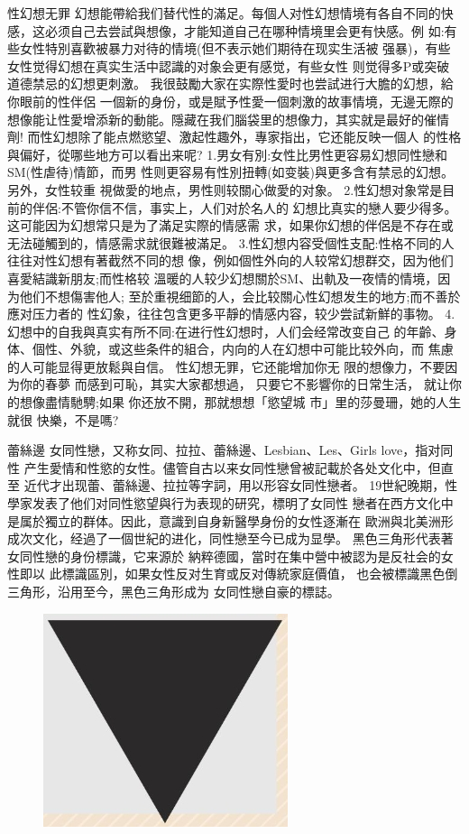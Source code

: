 \documentclass[12pt,UTF8]{ctexbook}
\begin{document}
性幻想无罪
幻想能帶給我们替代性的滿足。每個人对性幻想情境有各自不同的快
感，这必须自己去尝試與想像，才能知道自己在哪种情境里会更有快感。例
如:有些女性特別喜歡被暴力对待的情境(但不表示她们期待在现实生活被
强暴)，有些女性觉得幻想在真实生活中認識的对象会更有感觉，有些女性
则觉得多P或突破道德禁忌的幻想更刺激。
我很鼓勵大家在实際性愛时也尝試进行大膽的幻想，給你眼前的性伴侶
一個新的身份，或是賦予性愛一個刺激的故事情境，无邊无際的想像能让性愛增添新的動能。隱藏在我们腦袋里的想像力，其实就是最好的催情劑!
而性幻想除了能点燃慾望、激起性趣外，專家指出，它还能反映一個人
的性格與偏好，從哪些地方可以看出来呢?
1.男女有別:女性比男性更容易幻想同性戀和SM(性虐待)情節，而男
性则更容易有性別扭轉(如变裝)與更多含有禁忌的幻想。另外，女性较重
視做愛的地点，男性则较關心做愛的对象。
2.性幻想对象常是目前的伴侶:不管你信不信，事实上，人们对於名人的
幻想比真实的戀人要少得多。这可能因为幻想常只是为了滿足实際的情感需
求，如果你幻想的伴侶是不存在或无法碰觸到的，情感需求就很難被滿足。
3.性幻想内容受個性支配:性格不同的人往往对性幻想有著截然不同的想
像，例如個性外向的人较常幻想群交，因为他们喜愛結識新朋友;而性格较
溫暖的人较少幻想關於SM、出軌及一夜情的情境，因为他们不想傷害他人;
至於重視细節的人，会比较關心性幻想发生的地方;而不善於應对压力者的
性幻象，往往包含更多平靜的情感内容，较少尝試新鮮的事物。
4.幻想中的自我與真实有所不同:在进行性幻想时，人们会经常改变自己
的年齡、身体、個性、外貌，或这些条件的組合，内向的人在幻想中可能比较外向，而
焦慮的人可能显得更放鬆與自信。
性幻想无罪，它还能增加你无
限的想像力，不要因为你的春夢
而感到可恥，其实大家都想過，
只要它不影響你的日常生活，
就让你的想像盡情馳騁;如果
你还放不開，那就想想「慾望城
市」里的莎曼珊，她的人生就很
快樂，不是嗎?

蕾絲邊
女同性戀，又称女同、拉拉、蕾絲邊、Lesbian、Les、Girls love，指对同性
产生愛情和性慾的女性。儘管自古以来女同性戀曾被記載於各处文化中，但直至
近代才出现蕾、蕾絲邊、拉拉等字詞，用以形容女同性戀者。
19世紀晚期，性學家发表了他们对同性慾望與行为表现的研究，標明了女同性
戀者在西方文化中是属於獨立的群体。因此，意識到自身新醫學身份的女性逐漸在
歐洲與北美洲形成次文化，经過了一個世紀的进化，同性戀至今已成为显學。
黑色三角形代表著女同性戀的身份標識，它来源於
納粹德國，當时在集中營中被認为是反社会的女性即以
此標識區別，如果女性反对生育或反对傳統家庭價值，
也会被標識黑色倒三角形，沿用至今，黑色三角形成为
女同性戀自豪的標誌。

\begin{figure}[htbp]
	\centering
	\includegraphics[width=0.7\linewidth]{9}
	\caption{}
	\label{fig:1}
\end{figure}
\end{document}
